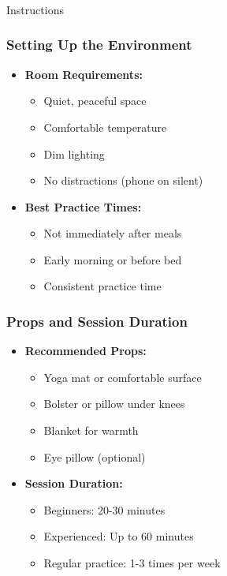 \begin{frame}[fragile]\frametitle{}
\begin{center}
{\Large Instructions}
\end{center}
\end{frame}

\begin{frame}[fragile]\frametitle{Setting Up the Environment}
    \begin{itemize}
        \item \textbf{Room Requirements:}
        \begin{itemize}
            \item Quiet, peaceful space
            \item Comfortable temperature
            \item Dim lighting
            \item No distractions (phone on silent)
        \end{itemize}
        \item \textbf{Best Practice Times:}
        \begin{itemize}
            \item Not immediately after meals
            \item Early morning or before bed
            \item Consistent practice time
        \end{itemize}
    \end{itemize}
\end{frame}

\begin{frame}[fragile]\frametitle{Props and Session Duration}
    \begin{itemize}
        \item \textbf{Recommended Props:}
        \begin{itemize}
            \item Yoga mat or comfortable surface
            \item Bolster or pillow under knees
            \item Blanket for warmth
            \item Eye pillow (optional)
        \end{itemize}
        \item \textbf{Session Duration:}
        \begin{itemize}
            \item Beginners: 20-30 minutes
            \item Experienced: Up to 60 minutes
            \item Regular practice: 1-3 times per week
        \end{itemize}
    \end{itemize}
\end{frame}

